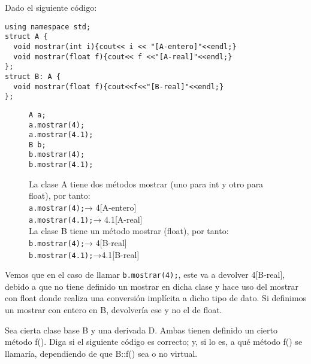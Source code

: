  Dado el siguiente código:

\begin{center}
  \begin{lstlisting}[frame = single]
using namespace std;
struct A {
  void mostrar(int i){cout<< i << "[A-entero]"<<endl;}
  void mostrar(float f){cout<< f <<"[A-real]"<<endl;}
};
struct B: A {
  void mostrar(float f){cout<<f<<"[B-real]"<<endl;}
};
  \end{lstlisting} 
\end{center}

\begin{figure}[h]
  \begin{minipage}{0.15\textwidth}
    \vspace*{-1cm}
\texttt{A a;}\\\texttt{a.mostrar(4);}\\ \texttt{a.mostrar(4.1);}\\

\texttt{B b;}\\\texttt{b.mostrar(4);}\\ \texttt{b.mostrar(4.1);}
  \end{minipage}
\hfill
  \begin{minipage}{0.75\textwidth}
    La clase A tiene dos métodos mostrar (uno para int y otro para float), por tanto:\\
    \texttt{a.mostrar(4);}→ 4[A-entero]\\
    \texttt{a.mostrar(4.1);}→ 4.1[A-real]\\

    La clase B tiene un método mostrar (float), por tanto:\\
    \texttt{b.mostrar(4);}→ 4[B-real] \\
    \texttt{b.mostrar(4.1);}→4.1[B-real] \\
  \end{minipage}  
\end{figure}

Vemos que en el caso de llamar \texttt{b.mostrar(4);}, este va a devolver 4[B-real], debido a que no tiene definido un mostrar en dicha clase y hace uso del mostrar con float donde realiza una conversión implícita a dicho tipo de dato. Si definimos un mostrar con entero en B, devolvería ese y no el de float.

 Sea cierta clase base B y una derivada D. Ambas tienen definido un cierto método f(). Diga si el siguiente código es correcto; y, si lo es, a qué método f() se llamaría, dependiendo de que B::f() sea o no virtual.

